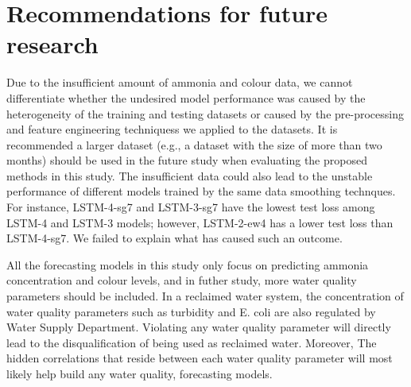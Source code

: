 \section{Recommendations for future research}
Due to the insufficient amount of ammonia and colour data, we cannot differentiate whether the undesired model performance was caused by the heterogeneity of the training and testing datasets or caused by the pre-processing and feature engineering techniquess we applied to the datasets. It is recommended a larger dataset (e.g., a dataset with the size of more than two months) should be used in the future study when evaluating the proposed methods in this study. The insufficient data could also lead to the unstable performance of different models trained by the same data smoothing technques. For instance, LSTM-4-sg7 and LSTM-3-sg7 have the lowest test loss among LSTM-4 and LSTM-3 models; however, LSTM-2-ew4 has a lower test loss than LSTM-4-sg7. We failed to explain what has caused such an outcome. 

All the forecasting models in this study only focus on predicting ammonia concentration and colour levels, and in futher study, more water quality parameters should be included. In a reclaimed water system, the concentration of water quality parameters such as turbidity and E. coli are also regulated by Water Supply Department. Violating any water quality parameter will directly lead to the disqualification of being used as reclaimed water. Moreover, The hidden correlations that reside between each water quality parameter will most likely help build any water quality, forecasting models.

